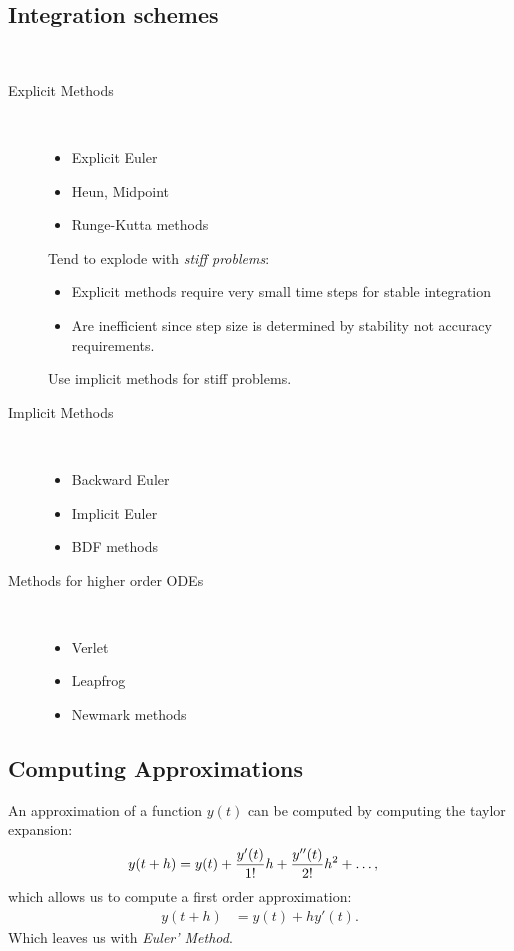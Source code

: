 \begin{multicols}{2}
\section{Integration schemes} $\textbf{}$
\begin{description}
	\item[Explicit Methods] $\textbf{}$
		\begin{itemize}
			\item Explicit Euler
			\item Heun, Midpoint
			\item Runge-Kutta methods
		\end{itemize}
		Tend to explode with \emph{stiff problems}:
		\begin{itemize}
			\item Explicit methods require very small time steps for stable integration
			\item Are inefficient since step size is determined by stability not accuracy requirements. 
		\end{itemize}
		Use implicit methods for stiff problems.
	\item[Implicit Methods] $\textbf{}$
		\begin{itemize}
			\item Backward Euler
			\item Implicit Euler
			\item BDF methods
		\end{itemize}
	\item[Methods for higher order ODEs] $\textbf{}$
		\begin{itemize}
			\item Verlet
			\item Leapfrog
			\item Newmark methods
		\end{itemize}
\end{description}

\subsection{Computing Approximations} An approximation of a function $y(t)$ can be computed by computing the taylor expansion:
\begin{align*}
	y(t+h) &= y(t) + {y'(t) \over 1!}h + {y''(t) \over 2!}h^2 + \ldots,
\end{align*}
which allows us to compute a first order approximation:
\begin{align*}
	y(t+h) &= y(t) + hy'(t).
\end{align*}
Which leaves us with \emph{Euler' Method}.


\end{multicols}
